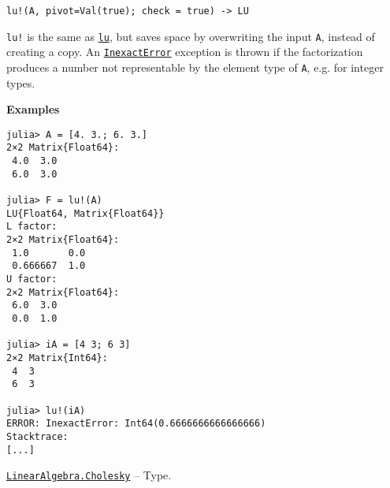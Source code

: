 \begin{adjustwidth}{2em}{0pt}


\begin{verbatim}
lu!(A, pivot=Val(true); check = true) -> LU
\end{verbatim}

\texttt{lu!} is the same as \hyperlink{5672569096214810830}{\texttt{lu}}, but saves space by overwriting the input \texttt{A}, instead of creating a copy. An \hyperlink{5399118524830636312}{\texttt{InexactError}} exception is thrown if the factorization produces a number not representable by the element type of \texttt{A}, e.g. for integer types.

\textbf{Examples}


\begin{verbatim}
julia> A = [4. 3.; 6. 3.]
2×2 Matrix{Float64}:
 4.0  3.0
 6.0  3.0

julia> F = lu!(A)
LU{Float64, Matrix{Float64}}
L factor:
2×2 Matrix{Float64}:
 1.0       0.0
 0.666667  1.0
U factor:
2×2 Matrix{Float64}:
 6.0  3.0
 0.0  1.0

julia> iA = [4 3; 6 3]
2×2 Matrix{Int64}:
 4  3
 6  3

julia> lu!(iA)
ERROR: InexactError: Int64(0.6666666666666666)
Stacktrace:
[...]
\end{verbatim}



\end{adjustwidth}
\hypertarget{17457903574632305101}{}
\hyperlink{17457903574632305101}{\texttt{LinearAlgebra.Cholesky}}  -- {Type.}

